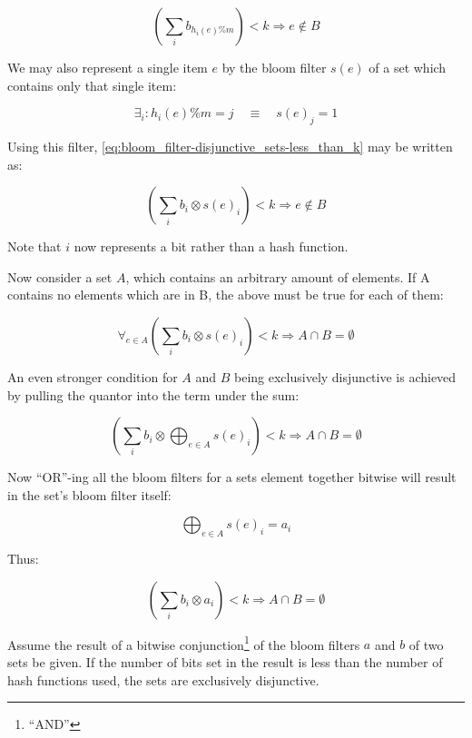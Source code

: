         \begin{equation}
            \left( \sum_i b_{h_i(e)\%m} \right) < k \Rightarrow e \notin B
            \label{eq:bloom_filter-disjunctive_sets-less_than_k}
        \end{equation}

        We may also represent a single item $e$ by the bloom filter $s(e)$ of a
        set which contains only that single item:

        \begin{equation}
            \exists_i : h_i(e)\%m = j \quad\equiv\quad s(e)_j = 1
        \end{equation}

        Using this filter, \ref{eq:bloom_filter-disjunctive_sets-less_than_k}
        may be written as:

        \begin{equation}
            \left( \sum_i b_i \otimes s(e)_i \right) < k \Rightarrow e \notin B
        \end{equation}

        Note that $i$ now represents a bit rather than a hash function.

        Now consider a set $A$, which contains an arbitrary amount of elements.
        If A contains no elements which are in B, the above must be true for
        each of them:

        \begin{equation}
            \forall_{e \in A} \left( \sum_i b_i \otimes s(e)_i \right) < k
            \Rightarrow A \cap B = \emptyset
        \end{equation}

        An even stronger condition for $A$ and $B$ being exclusively disjunctive
        is achieved by pulling the quantor into the term under the sum:

        \begin{equation}
            \left( \sum_i b_i \otimes \bigoplus_{e \in A} s(e)_i \right) < k
            \Rightarrow A \cap B = \emptyset
        \end{equation}

        Now ``OR''-ing all the bloom filters for a sets element together bitwise
        will result in the set's bloom filter itself:

        \begin{equation}
            \bigoplus_{e \in A} s(e)_i = a_i
        \end{equation}

        Thus:

        \begin{equation}
            \left( \sum_i b_i \otimes a_i \right) < k
            \Rightarrow A \cap B = \emptyset
        \end{equation}

        Assume the result of a bitwise conjunction\footnote{``AND''} of the
        bloom filters $a$ and $b$ of two sets be given. If the number of bits
        set in the result is less than the number of hash functions used, the
        sets are exclusively disjunctive.


